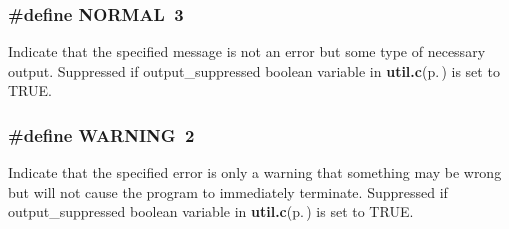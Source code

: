 \subsubsection{\setlength{\rightskip}{0pt plus 5cm}\#define NORMAL\ 3}\label{group__output__type_a2}


Indicate that the specified message is not an error but some type of necessary output. Suppressed if output\_\-suppressed boolean variable in {\bf util.c}{\rm (p.\,\pageref{util_8c})} is set to TRUE. 
\subsubsection{\setlength{\rightskip}{0pt plus 5cm}\#define WARNING\ 2}\label{group__output__type_a1}


Indicate that the specified error is only a warning that something may be wrong but will not cause the program to immediately terminate. Suppressed if output\_\-suppressed boolean variable in {\bf util.c}{\rm (p.\,\pageref{util_8c})} is set to TRUE. 